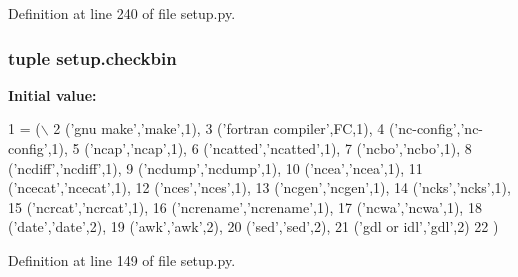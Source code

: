 Definition at line 240 of file setup.\+py.

\subsubsection[{\texorpdfstring{checkbin}{checkbin}}]{\setlength{\rightskip}{0pt plus 5cm}tuple setup.\+checkbin}\hypertarget{namespacesetup_a38fd627eae7d93f3366e9b4f707e77dd}{}\label{namespacesetup_a38fd627eae7d93f3366e9b4f707e77dd}
{\bfseries Initial value\+:}
\begin{DoxyCode}
1 = (\(\backslash\)
2         (\textcolor{stringliteral}{'gnu make'},\textcolor{stringliteral}{'make'},1),
3         (\textcolor{stringliteral}{'fortran compiler'},FC,1),
4         (\textcolor{stringliteral}{'nc-config'},\textcolor{stringliteral}{'nc-config'},1),
5         (\textcolor{stringliteral}{'ncap'},\textcolor{stringliteral}{'ncap'},1),
6         (\textcolor{stringliteral}{'ncatted'},\textcolor{stringliteral}{'ncatted'},1),
7         (\textcolor{stringliteral}{'ncbo'},\textcolor{stringliteral}{'ncbo'},1),
8         (\textcolor{stringliteral}{'ncdiff'},\textcolor{stringliteral}{'ncdiff'},1),
9         (\textcolor{stringliteral}{'ncdump'},\textcolor{stringliteral}{'ncdump'},1),
10         (\textcolor{stringliteral}{'ncea'},\textcolor{stringliteral}{'ncea'},1),
11         (\textcolor{stringliteral}{'ncecat'},\textcolor{stringliteral}{'ncecat'},1),
12         (\textcolor{stringliteral}{'nces'},\textcolor{stringliteral}{'nces'},1),
13         (\textcolor{stringliteral}{'ncgen'},\textcolor{stringliteral}{'ncgen'},1),
14         (\textcolor{stringliteral}{'ncks'},\textcolor{stringliteral}{'ncks'},1),
15         (\textcolor{stringliteral}{'ncrcat'},\textcolor{stringliteral}{'ncrcat'},1),
16         (\textcolor{stringliteral}{'ncrename'},\textcolor{stringliteral}{'ncrename'},1),
17         (\textcolor{stringliteral}{'ncwa'},\textcolor{stringliteral}{'ncwa'},1),
18         (\textcolor{stringliteral}{'date'},\textcolor{stringliteral}{'date'},2),
19         (\textcolor{stringliteral}{'awk'},\textcolor{stringliteral}{'awk'},2),
20         (\textcolor{stringliteral}{'sed'},\textcolor{stringliteral}{'sed'},2),
21         (\textcolor{stringliteral}{'gdl or idl'},\textcolor{stringliteral}{'gdl'},2)
22         )
\end{DoxyCode}


Definition at line 149 of file setup.\+py.

